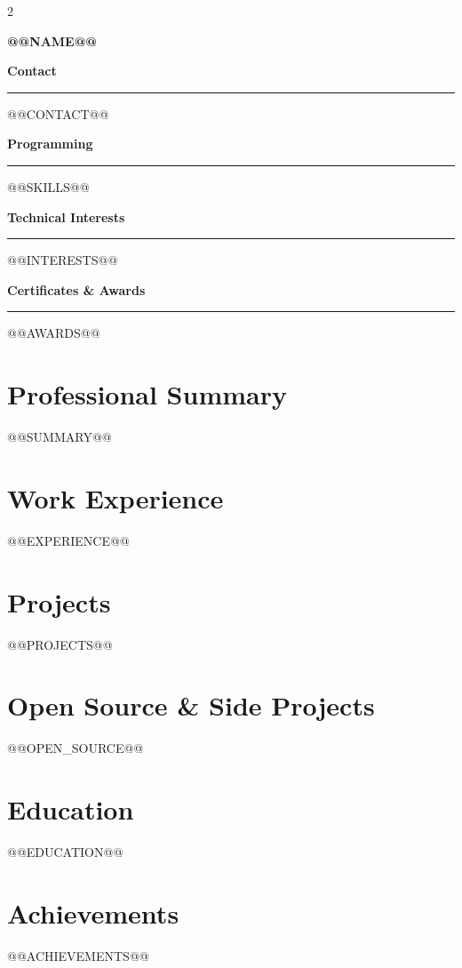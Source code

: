 \documentclass[10pt,a4paper]{article}
\newcommand{\sidebarsection}[1]{%
    \vspace{0.5em}
    {\large\bfseries\textcolor{textlight}{#1}}\\[0.3em]
    \textcolor{accentcolor}{\rule{0.9\linewidth}{1pt}}
    \vspace{0.3em}
}
\begin{document}
\begin{paracol}{2}

\begin{leftcolumn}
\begin{minipage}[t]{\linewidth}
\vspace{0.5cm}
\hspace{0.3cm}
\begin{minipage}[t]{0.9\linewidth}

\begin{center}
{\LARGE\bfseries\textcolor{textlight}{@@NAME@@}}
\end{center}
\vspace{0.5em}

\sidebarsection{Contact}
@@CONTACT@@

\sidebarsection{Programming}
@@SKILLS@@

\sidebarsection{Technical Interests}
@@INTERESTS@@

\sidebarsection{Certificates \& Awards}
@@AWARDS@@

\end{minipage}
\end{minipage}
\end{leftcolumn}

\begin{rightcolumn}
\vspace{0.3cm}

\section*{Professional Summary}
@@SUMMARY@@

\section*{Work Experience}
@@EXPERIENCE@@

\section*{Projects}
@@PROJECTS@@

\section*{Open Source \& Side Projects}
@@OPEN_SOURCE@@

\section*{Education}
@@EDUCATION@@

\section*{Achievements}
@@ACHIEVEMENTS@@

\end{rightcolumn}

\end{paracol}
\end{document}
